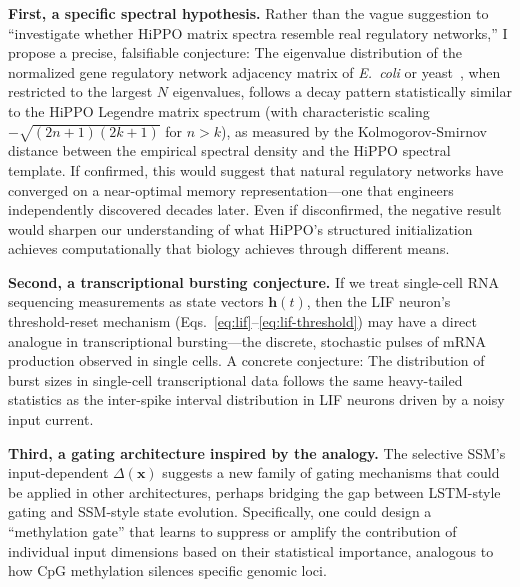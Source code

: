 \documentclass[12pt,a4paper]{article}
\renewcommand{\vec}[1]{\mathbf{#1}}
\begin{document}
\textbf{First, a specific spectral hypothesis.} Rather than the vague suggestion to ``investigate whether HiPPO matrix spectra resemble real regulatory networks,'' I propose a precise, falsifiable conjecture: The eigenvalue distribution of the normalized gene regulatory network adjacency matrix of \emph{E.~coli} or yeast~\cite{alon2006}, when restricted to the largest $N$ eigenvalues, follows a decay pattern statistically similar to the HiPPO Legendre matrix spectrum (with characteristic scaling $-\sqrt{(2n+1)(2k+1)}$ for $n > k$), as measured by the Kolmogorov-Smirnov distance between the empirical spectral density and the HiPPO spectral template. If confirmed, this would suggest that natural regulatory networks have converged on a near-optimal memory representation---one that engineers independently discovered decades later. Even if disconfirmed, the negative result would sharpen our understanding of what HiPPO's structured initialization achieves computationally that biology achieves through different means.

\textbf{Second, a transcriptional bursting conjecture.} If we treat single-cell RNA sequencing measurements as state vectors $\vec{h}(t)$, then the LIF neuron's threshold-reset mechanism (Eqs.~\eqref{eq:lif}--\eqref{eq:lif-threshold}) may have a direct analogue in transcriptional bursting---the discrete, stochastic pulses of mRNA production observed in single cells. A concrete conjecture: The distribution of burst sizes in single-cell transcriptional data follows the same heavy-tailed statistics as the inter-spike interval distribution in LIF neurons driven by a noisy input current.

\textbf{Third, a gating architecture inspired by the analogy.} The selective SSM's input-dependent $\Delta(\vec{x})$ suggests a new family of gating mechanisms that could be applied in other architectures, perhaps bridging the gap between LSTM-style gating and SSM-style state evolution. Specifically, one could design a ``methylation gate'' that learns to suppress or amplify the contribution of individual input dimensions based on their statistical importance, analogous to how CpG methylation silences specific genomic loci.
\end{document}
